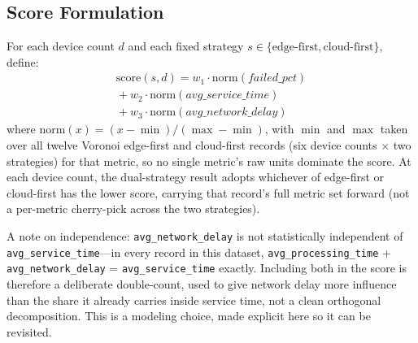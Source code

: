 \documentclass[10pt,conference]{IEEEtran}
\begin{document}
\subsection{Score Formulation}\label{sub:scoreform}
For each device count $d$ and each fixed strategy $s \in \{\text{edge-first}, \text{cloud-first}\}$, define:
\begin{multline}\label{eq:score}
\mathrm{score}(s,d) = w_1 \cdot \mathrm{norm}(\mathit{failed\_pct}) \\
{}+ w_2 \cdot \mathrm{norm}(\mathit{avg\_service\_time}) \\
{}+ w_3 \cdot \mathrm{norm}(\mathit{avg\_network\_delay})
\end{multline}
where $\mathrm{norm}(x) = (x - \min)/(\max - \min)$, with $\min$ and $\max$ taken over all twelve Voronoi edge-first and cloud-first records (six device counts $\times$ two strategies) for that metric, so no single metric's raw units dominate the score. At each device count, the dual-strategy result adopts whichever of edge-first or cloud-first has the lower score, carrying that record's full metric set forward (not a per-metric cherry-pick across the two strategies).

A note on independence: \texttt{avg\_network\_delay} is not statistically independent of \texttt{avg\_service\_time}---in every record in this dataset, \texttt{avg\_processing\_time} + \texttt{avg\_network\_delay} = \texttt{avg\_service\_time} exactly. Including both in the score is therefore a deliberate double-count, used to give network delay more influence than the share it already carries inside service time, not a clean orthogonal decomposition. This is a modeling choice, made explicit here so it can be revisited.
\end{document}
